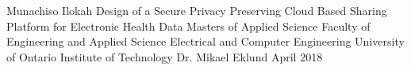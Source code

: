 

\usepackage{hyperref}
\hypersetup{
    colorlinks,
    citecolor=black,
    filecolor=black,
    linkcolor=black,
    urlcolor=black
}



\thesisTitle
  {Munachiso Ilokah}
  {Design of a Secure Privacy Preserving Cloud Based Sharing Platform for Electronic Health Data}
  {Masters of Applied Science}
  {Faculty of Engineering and Applied Science}
  {Electrical and Computer Engineering}
  {University of Ontario Institute of Technology}
  {Dr. Mikael Eklund}
  {April}
  {2018}




\singlespacing
\tableofcontents
\listoffigures
\listoftables
\printglossary[style=list]
\clearpage
\doublespacing






%
%










%


